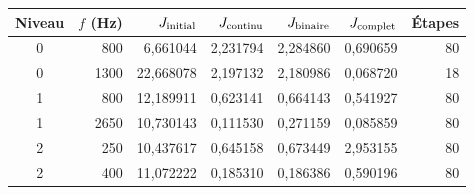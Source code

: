 \begin{tabular}{crrrrrr}
\toprule
Niveau & $f$ (Hz) & $J_{\rm initial}$ & $J_{\rm continu}$ & $J_{\rm binaire}$ & $J_{\rm complet}$ & Étapes\\
\midrule
0 & 800 & 6,661044 & 2,231794 & 2,284860 & 0,690659 & 80\\
0 & 1300 & 22,668078 & 2,197132 & 2,180986 & 0,068720 & 18\\
1 & 800 & 12,189911 & 0,623141 & 0,664143 & 0,541927 & 80\\
1 & 2650 & 10,730143 & 0,111530 & 0,271159 & 0,085859 & 80\\
2 & 250 & 10,437617 & 0,645158 & 0,673449 & 2,953155 & 80\\
2 & 400 & 11,072222 & 0,185310 & 0,186386 & 0,590196 & 80\\
\bottomrule
\end{tabular}
